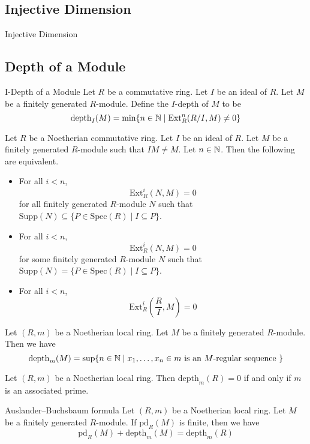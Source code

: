 \documentclass[a4paper]{article}
\begin{document}
\subsection{Injective Dimension}
\begin{defn}{Injective Dimension}{}
\end{defn}

\subsection{Depth of a Module}
\begin{defn}{I-Depth of a Module}{} Let $R$ be a commutative ring. Let $I$ be an ideal of $R$. Let $M$ be a finitely generated $R$-module. Define the $I$-depth of $M$ to be $$\text{depth}_I(M)=\min\{n\in\mathbb{N}\;|\;\text{Ext}_R^n(R/I,M)\neq 0\}$$
\end{defn}

\begin{prp}{}{} Let $R$ be a Noetherian commutative ring. Let $I$ be an ideal of $R$. Let $M$ be a finitely generated $R$-module such that $IM\neq M$. Let $n\in\mathbb{N}$. Then the following are equivalent. 
\begin{itemize}
\item For all $i<n$, $$\text{Ext}_R^i(N,M)=0$$ for all finitely generated $R$-module $N$ such that $\text{Supp}(N)\subseteq\{P\in\text{Spec}(R)\;|\;I\subseteq P\}$. 
\item For all $i<n$, $$\text{Ext}_R^i(N,M)=0$$ for some finitely generated $R$-module $N$ such that $\text{Supp}(N)=\{P\in\text{Spec}(R)\;|\;I\subseteq P\}$. 
\item For all $i<n$, $$\text{Ext}_R^i\left(\frac{R}{I},M\right)=0$$
\end{itemize}
\end{prp}

\begin{prp}{}{} Let $(R,m)$ be a Noetherian local ring. Let $M$ be a finitely generated $R$-module. Then we have $$\text{depth}_m(M)=\sup\{n\in\mathbb{N}\;|\;x_1,\dots,x_n\in m\text{ is an }M\text{-regular sequence }\}$$
\end{prp}

\begin{prp}{}{} Let $(R,m)$ be a Noetherian local ring. Then $\text{depth}_m(R)=0$ if and only if $m$ is an associated prime. 
\end{prp}

\begin{thm}{Auslander–Buchsbaum formula}{} Let $(R,m)$ be a Noetherian local ring. Let $M$ be a finitely generated $R$-module. If $\text{pd}_R(M)$ is finite, then we have $$\text{pd}_R(M)+\text{depth}_m(M)=\text{depth}_m(R)$$
\end{thm}
\end{document}
